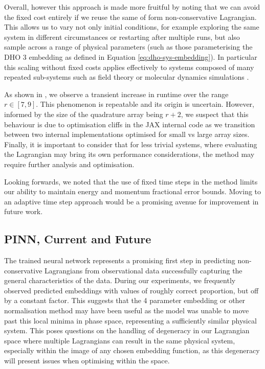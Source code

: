 Overall, however this approach is made more fruitful by noting that we can avoid the fixed cost entirely if we reuse the same of form non-conservative Lagrangian. This allows us to vary not only initial conditions, for example exploring the same system in different circumstances or restarting after multiple runs, but also sample across a range of physical parameters (such as those parameterising the DHO 3 embedding as defined in Equation \eqref{eq:dho-sys-embedding}). In particular this scaling without fixed costs applies effectively to systems composed of many repeated sub-systems such as field theory or molecular dynamics simulations \cite{tuckermanUnderstandingModernMolecular2000b}.

As shown in , we observe a transient increase in runtime over the range $r \in [7, 9]$. This phenomenon is repeatable and its origin is uncertain. However, informed by the size of the quadrature array being $r + 2$, we suspect that this behaviour is due to optimisation cliffs in the JAX internal code as we transition between two internal implementations optimised for small vs large array sizes. Finally, it is important to consider that for less trivial systems, where evaluating the Lagrangian may bring its own performance considerations, the method may require further analysis and optimisation.

Looking forwards, we noted that the use of fixed time steps in the method limits our ability to maintain energy and momentum fractional error bounds. Moving to an adaptive time step approach would be a promising avenue for improvement in future work.

\subsection{PINN, Current and Future}

The trained neural network represents a promising first step in predicting non-conservative Lagrangians from observational data successfully capturing the general characteristics of the data.
During our experiments, we frequently observed predicted embeddings with values of roughly correct proportion, but off by a constant factor. This suggests that the 4 parameter embedding or other normalisation method may have been useful as the model was unable to move past this local minima in phase space, representing a sufficiently similar physical system. 
This poses questions on the handling of degeneracy in our Lagrangian space where multiple Lagrangians can result in the same physical system, especially within the image of any chosen embedding function, as this degeneracy will present issues when optimising within the space.

